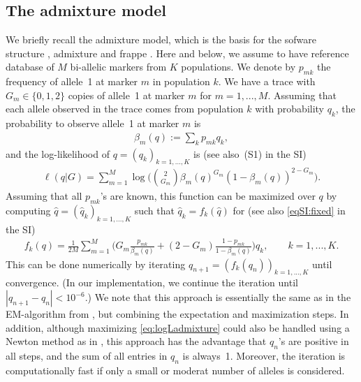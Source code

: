 \documentclass[12pt]{article}
\theoremstyle{definition}
\begin{document}
\subsection{The admixture model}
We briefly recall the admixture model, which is the basis for the
sofware {\sc structure} \cite{Pritchard2000}, {\sc admixture}
\cite{Alexander2009} and {\sc frappe} \cite{Tang2005}.  Here and
below, we assume to have reference database of $M$ bi-allelic markers
from $K$ populations. We denote by $p_{mk}$ the frequency of allele~1
at marker $m$ in population $k$. We have a trace with
$G_m \in \{0,1,2\}$ copies of allele~1 at marker $m$ for
$m=1,...,M$. Assuming that each allele observed in the trace comes
from population $k$ with probability $q_k$, the probability to observe
allele~1 at marker $m$ is
\begin{align}
  \label{eq:beta}
  \beta_m(q) := \sum_k p_{mk} q_k,  
\end{align}
and the log-likelihood of $q = (q_k)_{k=1,...,K}$ is (see also~(S1) in
the SI)
\begin{align}\label{eq:logLadmixture}
  \ell(q|G) = \sum_{m=1}^M \log\Big(\binom{2}{G_m} \beta_m(q)^{G_m}(1-\beta_m(q))^{2-G_m}\Big).
\end{align}
Assuming that all $p_{mk}$'s are known, this function can be maximized
over $q$ by computing $\hat q = (\hat q_k)_{k=1,...,K}$ such that
$\hat q_k = f_k(\hat q)$ for (see also \eqref{eqSI:fixed} in the SI)
\begin{align}\label{eq:fixed}
  f_k(q) =
  \frac{1}{2M} \sum_{m=1}^M \Big(G_m \frac{p_{mk}}{\beta_m(q)} + (2-G_m)\frac{1-p_{mk}}{1-\beta_m(q)}\Big)q_k,
  \qquad k =1,...,K.
\end{align}
This can be done numerically by iterating
$q_{n+1} = (f_k(q_n))_{k=1,...,K}$ until convergence. (In our
implementation, we continue the iteration until
$|q_{n+1} - q_n|< 10^{-6}$.) We note that this approach is essentially
the same as in the EM-algorithm from \cite{Tang2005}, but combining
the expectation and maximization steps. In addition, although
maximizing \eqref{eq:logLadmixture} could also be handled using a
Newton method as in \cite{Alexander2009}, this approach has the
advantage that $q_n$'s are positive in all steps, and the sum of all
entries in $q_n$ is always~1. Moreover, the iteration is
computationally fast if only a small or moderat number of alleles is
considered.
\end{document}
